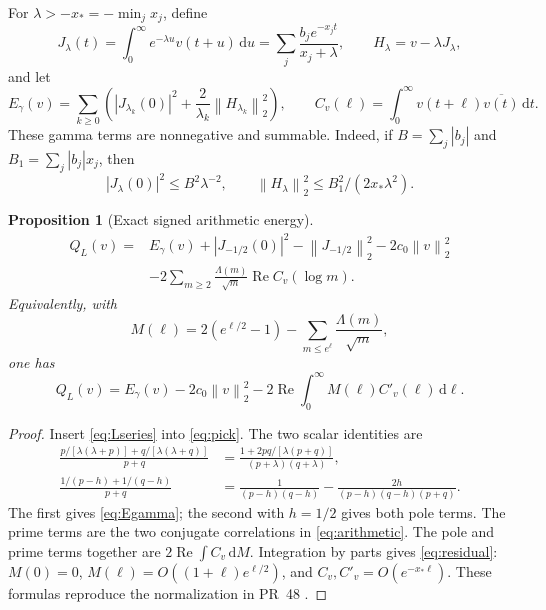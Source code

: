 \documentclass[11pt,letterpaper]{article}
\newtheorem{proposition}[theorem]{Proposition}
\theoremstyle{definition}
\theoremstyle{remark}
\newcommand{\dd}{\,\mathrm d}
\newcommand{\Rea}{\operatorname{Re}}
\newcommand{\norm}[1]{\left\lVert#1\right\rVert}
\newcommand{\abs}[1]{\left\lvert#1\right\rvert}
\numberwithin{equation}{section}
\begin{document}
For $\lambda>-x_*=-\min_jx_j$, define
\[
 J_\lambda(t)=\int_0^\infty e^{-\lambda u}v(t+u)\dd u
 =\sum_j\frac{b_je^{-x_jt}}{x_j+\lambda},\qquad
 H_\lambda=v-\lambda J_\lambda,
\]
and let
\begin{equation}\label{eq:Egamma}
 E_\gamma(v)=\sum_{k\ge0}\left(\abs{J_{\lambda_k}(0)}^2+
          \frac2{\lambda_k}\norm{H_{\lambda_k}}_2^2\right),\qquad
 C_v(\ell)=\int_0^\infty v(t+\ell)\overline{v(t)}\dd t.
\end{equation}
These gamma terms are nonnegative and summable. Indeed, if $B=\sum_j\abs{b_j}$ and $B_1=\sum_j\abs{b_j}x_j$, then
\[
 \abs{J_\lambda(0)}^2\le B^2\lambda^{-2},\qquad
 \norm{H_\lambda}_2^2\le B_1^2/(2x_*\lambda^2).
\]

\begin{proposition}[Exact signed arithmetic energy]\label{prop:energy}
\begin{align}\label{eq:arithmetic}
 Q_L(v)={}&E_\gamma(v)+\abs{J_{-1/2}(0)}^2-\norm{J_{-1/2}}_2^2
            -2c_0\norm v_2^2\nonumber\\
          &-2\sum_{m\ge2}\frac{\Lambda(m)}{\sqrt m}\Rea C_v(\log m).
\end{align}
Equivalently, with
\begin{equation}\label{eq:M}
 M(\ell)=2(e^{\ell/2}-1)-\sum_{m\le e^\ell}\frac{\Lambda(m)}{\sqrt m},
\end{equation}
one has
\begin{equation}\label{eq:residual}
 Q_L(v)=E_\gamma(v)-2c_0\norm v_2^2
              -2\Rea\int_0^\infty M(\ell)C'_v(\ell)\dd\ell.
\end{equation}
\end{proposition}
\begin{proof}
Insert \eqref{eq:Lseries} into \eqref{eq:pick}. The two scalar identities are
\begin{align*}
 \frac{p/[\lambda(\lambda+p)]+q/[\lambda(\lambda+q)]}{p+q}
 &=\frac{1+2pq/[\lambda(p+q)]}{(p+\lambda)(q+\lambda)},\\
 \frac{1/(p-h)+1/(q-h)}{p+q}
 &=\frac1{(p-h)(q-h)}-\frac{2h}{(p-h)(q-h)(p+q)}.
\end{align*}
The first gives \eqref{eq:Egamma}; the second with $h=1/2$ gives both pole terms. The prime terms are the two conjugate correlations in \eqref{eq:arithmetic}. The pole and prime terms together are $2\Rea\int C_v\dd M$. Integration by parts gives \eqref{eq:residual}: $M(0)=0$, $M(\ell)=O((1+\ell)e^{\ell/2})$, and $C_v,C'_v=O(e^{-x_*\ell})$. These formulas reproduce the normalization in PR~48 \cite{pr48}.
\end{proof}
\end{document}
